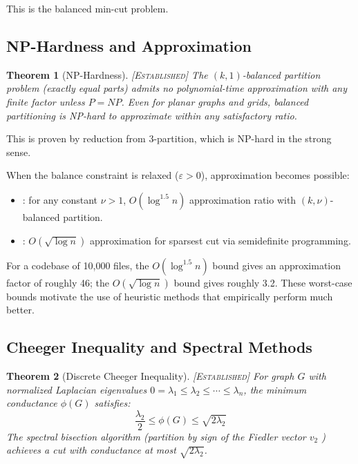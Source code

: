 \documentclass[11pt, a4paper, logo, copyright]{googledeepmind}
\newtheorem{theorem}{Theorem}[section]
\newcommand{\established}{\textsc{[Established]}}
\begin{document}
This is the balanced min-cut problem.

\subsection{NP-Hardness and Approximation}

\begin{theorem}[NP-Hardness] \established{}
\label{thm:nphard}
The $(k, 1)$-balanced partition problem (exactly equal parts) admits no polynomial-time approximation with any finite factor unless $P = NP$.
Even for planar graphs and grids, balanced partitioning is NP-hard to approximate within any satisfactory ratio.
\end{theorem}

This is proven by reduction from 3-partition, which is NP-hard in the strong sense.

When the balance constraint is relaxed ($\varepsilon > 0$), approximation becomes possible:

\begin{itemize}[nosep]
  \item \citet{AndreevRacke2006}: for any constant $\nu > 1$, $O(\log^{1.5} n)$ approximation ratio with $(k, \nu)$-balanced partition.
  \item \citet{AroraRaoVazirani2009}: $O(\sqrt{\log n})$ approximation for sparsest cut via semidefinite programming.
\end{itemize}

For a codebase of 10,000 files, the $O(\log^{1.5} n)$ bound gives an approximation factor of roughly 46; the $O(\sqrt{\log n})$ bound gives roughly 3.2.
These worst-case bounds motivate the use of heuristic methods that empirically perform much better.

\subsection{Cheeger Inequality and Spectral Methods}

\begin{theorem}[Discrete Cheeger Inequality] \established{}
\label{thm:cheeger}
For graph $G$ with normalized Laplacian eigenvalues $0 = \lambda_1 \leq \lambda_2 \leq \cdots \leq \lambda_n$, the minimum conductance $\phi(G)$ satisfies:
\begin{equation}
\label{eq:cheeger}
  \frac{\lambda_2}{2} \leq \phi(G) \leq \sqrt{2\lambda_2}
\end{equation}
The spectral bisection algorithm (partition by sign of the Fiedler vector $v_2$ \citep{Fiedler1973}) achieves a cut with conductance at most $\sqrt{2\lambda_2}$.
\end{theorem}
\end{document}
